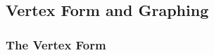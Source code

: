 \documentclass[12pt]{book}
\theoremstyle{definition}
\begin{document}
\begin{multicols}{4}
\end{multicols}

\subsection*{Vertex Form and Graphing}

\subsubsection{The Vertex Form}
\end{document}
